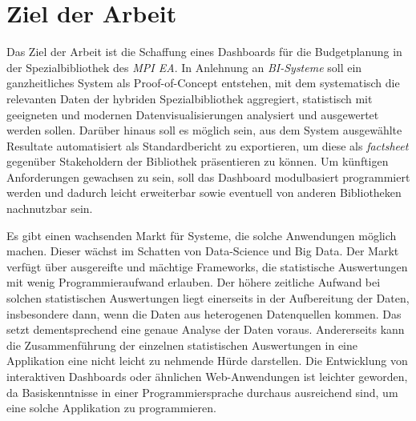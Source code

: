\section{Ziel der Arbeit}
Das Ziel der Arbeit ist die Schaffung eines Dashboards für die Budgetplanung in der Spezialbibliothek des \textit{\acrshort{MPI EA}}.
In Anlehnung an \textit{\acrshort{BI}-Systeme} soll ein ganzheitliches System als Proof-of-Concept entstehen,
mit dem systematisch die relevanten Daten der hybriden Spezialbibliothek aggregiert, statistisch
mit geeigneten und modernen Datenvisualisierungen analysiert und ausgewertet werden sollen.
Darüber hinaus soll es möglich sein, aus dem System ausgewählte
Resultate automatisiert als Standardbericht zu exportieren, um diese
als \textit{factsheet} gegenüber Stakeholdern der Bibliothek präsentieren zu können.
Um künftigen Anforderungen gewachsen zu sein, soll das Dashboard
modulbasiert programmiert werden und dadurch leicht erweiterbar sowie eventuell von
anderen Bibliotheken nachnutzbar sein.


Es gibt einen wachsenden Markt für Systeme, die solche Anwendungen möglich machen. Dieser wächst im Schatten von Data-Science und Big Data. 
Der Markt verfügt über ausgereifte und mächtige Frameworks, die statistische Auswertungen mit wenig Programmieraufwand erlauben. 
Der höhere zeitliche Aufwand bei solchen statistischen Auswertungen liegt  einerseits in der Aufbereitung der Daten, 
insbesondere dann, wenn die Daten aus heterogenen Datenquellen kommen. 
Das setzt dementsprechend eine genaue Analyse der Daten voraus. Andererseits kann die Zusammenführung der einzelnen statistischen Auswertungen in eine Applikation 
eine nicht leicht zu nehmende Hürde darstellen. Die Entwicklung von interaktiven Dashboards oder ähnlichen Web-Anwendungen ist leichter geworden, da
Basiskenntnisse in einer Programmiersprache durchaus ausreichend sind, um eine solche Applikation zu programmieren.


